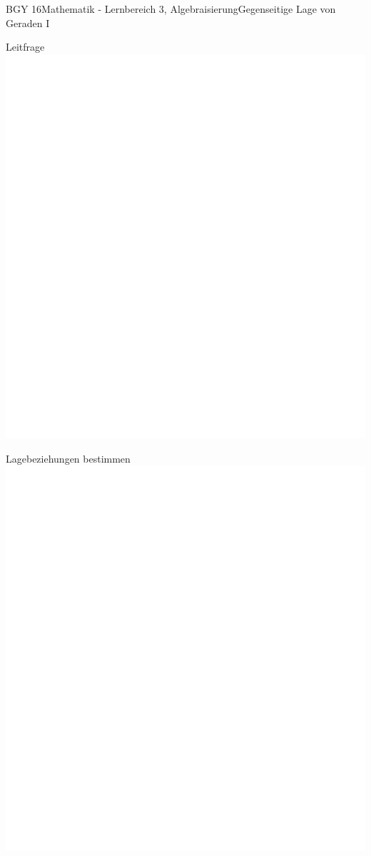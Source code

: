 \documentclass[oneside,openany,headings=optiontotoc,11pt,numbers=noenddot]{scrreprt}
\begin{document}
\begin{worksheet}{BGY 16}{Mathematik - Lernbereich 3, Algebraisierung}{Gegenseitige Lage von Geraden I}
\begin{framed}
		\end{framed}
		\begin{framed}
			\noindent
			\tiny{\color{codegray}Leitfrage}\\
			\includegraphics[scale=0.05]{../empty.jpg}
		\end{framed}
		\begin{framed}
			\noindent
			\tiny{\color{codegray}Lagebeziehungen bestimmen}\\
			\includegraphics[scale=0.35]{../empty.jpg}\\

\end{framed}
\end{worksheet}
\end{document}
